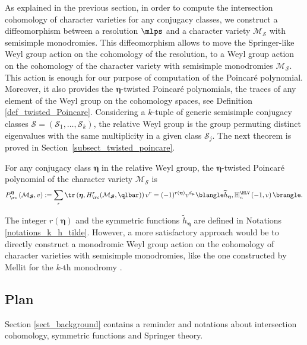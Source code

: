 As explained in the previous section, in order to compute the intersection cohomology of character varieties for any conjugacy classes, we construct a diffeomorphism between a resolution $\mlps$ and a character variety $\mathcal{M}_{\boldsymbol{\mathcal{S}}}$ with semisimple monodromies. This diffeomorphism allows to move the Springer-like Weyl group action on the cohomology of the resolution, to a Weyl group action on the cohomology of the character variety with semisimple monodromies $\mathcal{M}_{\boldsymbol{\mathcal{S}}}$. This action is enough for our purpose of computation of the Poincaré polynomial. Moreover, it also provides the $\boldsymbol{\eta}$-twisted Poincaré polynomials, \ie the traces of any element of the Weyl group on the cohomology spaces, see Definition \ref{def_twisted_Poincare}. Considering a $k$-tuple of generic semisimple conjugacy classes $\boldsymbol{\mathcal{S}}=\left(\mathcal{S}_1,\dots,\mathcal{S}_k\right)$, the relative Weyl group is the group permuting distinct eigenvalues with the same multiplicity in a given class $\mathcal{S}_j$. The next theorem is proved in Section~\ref{subsect_twisted_poincare}.
\begin{theorem}\label{th_twisted_intro}
For any conjugacy class $\boldsymbol{\eta}$ in the relative Weyl group, the $\boldsymbol{\eta}$-twisted Poincaré polynomial of the character variety $\mathcal{M}_{\boldsymbol{\mathcal{S}}}$ is
\[
P_{\rc}^{\boldsymbol{\eta}}\left(\mathcal{M}_{\boldsymbol{\mathcal{S}}},v\right) :=\sum_{r} \tr\left(\boldsymbol{\eta},H_\rc^r(\mathcal{M}_{\boldsymbol{\mathcal{S}}}, \qlbar)\right)v^r = (-1)^{r(\boldsymbol{\eta})}v^{d_{\boldsymbol{\mu}}}\blangle \widetilde{h}_{\boldsymbol{\eta}},\mathbb{H}_n^{\HLV}\left(-1,v\right)\brangle.
\]
\end{theorem}

The integer $r(\boldsymbol{\eta})$ and the symmetric functions $\widetilde{h}_{\boldsymbol{\eta}}$ are defined in Notations \ref{notations_k_h_tilde}. However, a more satisfactory approach would be to directly construct a monodromic Weyl group action on the cohomology of character varieties with semisimple monodromies, like the one constructed by Mellit for the $k$-th monodromy \cite{Mellit2019}.

\subsection{Plan}
Section \ref{sect_background} contains a reminder and notations about intersection cohomology, symmetric functions and Springer theory.

